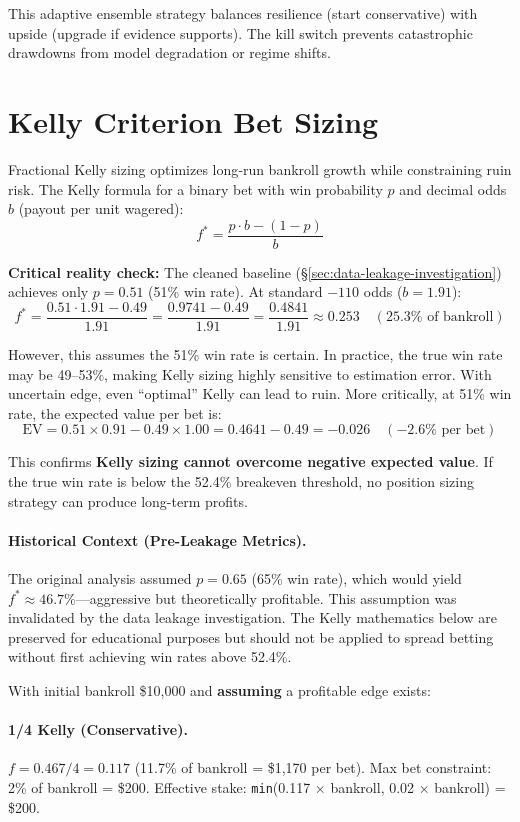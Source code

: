 This adaptive ensemble strategy balances resilience (start conservative) with upside (upgrade if evidence supports). The kill switch prevents catastrophic drawdowns from model degradation or regime shifts.

\section{Kelly Criterion Bet Sizing}
\label{sec:kelly_sizing}

Fractional Kelly sizing optimizes long‑run bankroll growth while constraining ruin risk. The Kelly formula for a binary bet with win probability $p$ and decimal odds $b$ (payout per unit wagered):
\[
f^* = \frac{p \cdot b - (1 - p)}{b}
\]

\textbf{Critical reality check:} The cleaned baseline (\S\ref{sec:data-leakage-investigation}) achieves only $p = 0.51$ (51\% win rate). At standard $-110$ odds ($b = 1.91$):
\[
f^* = \frac{0.51 \cdot 1.91 - 0.49}{1.91} = \frac{0.9741 - 0.49}{1.91} = \frac{0.4841}{1.91} \approx 0.253 \quad (25.3\% \text{ of bankroll})
\]

However, this assumes the 51\% win rate is certain. In practice, the true win rate may be 49--53\%, making Kelly sizing highly sensitive to estimation error. With uncertain edge, even ``optimal'' Kelly can lead to ruin. More critically, at 51\% win rate, the expected value per bet is:
\[
\text{EV} = 0.51 \times 0.91 - 0.49 \times 1.00 = 0.4641 - 0.49 = -0.026 \quad (-2.6\% \text{ per bet})
\]

This confirms \textbf{Kelly sizing cannot overcome negative expected value}. If the true win rate is below the 52.4\% breakeven threshold, no position sizing strategy can produce long-term profits.

\paragraph{Historical Context (Pre-Leakage Metrics).}
The original analysis assumed $p = 0.65$ (65\% win rate), which would yield $f^* \approx 46.7\%$---aggressive but theoretically profitable. This assumption was invalidated by the data leakage investigation. The Kelly mathematics below are preserved for educational purposes but should not be applied to spread betting without first achieving win rates above 52.4\%.

With initial bankroll \$10,000 and \textbf{assuming} a profitable edge exists:

\paragraph{1/4 Kelly (Conservative).}
$f = 0.467 / 4 = 0.117$ (11.7\% of bankroll = \$1,170 per bet). Max bet constraint: 2\% of bankroll = \$200. Effective stake: \texttt{min}(0.117 × bankroll, 0.02 × bankroll) = \$200.

